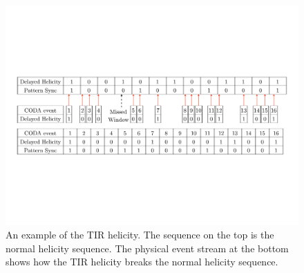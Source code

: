 \begin{figure}[tb!]
  \centering
  \includegraphics[width=\textwidth]{figs/tir-helicity.pdf}
  \caption[An example of the TIR helicity.]{An example of the TIR helicity. The sequence on the top is the normal helicity sequence. The physical event stream at the bottom shows how the TIR helicity breaks the normal helicity sequence. \label{A1S2SS2F1}}
\end{figure}

